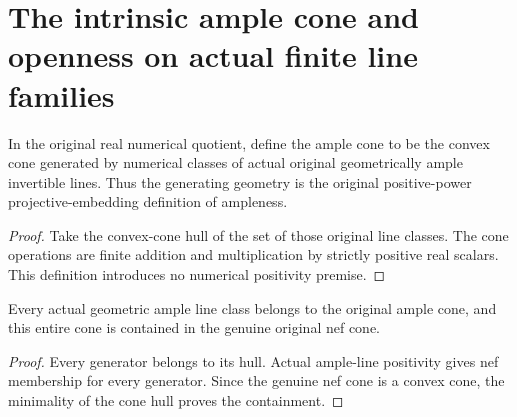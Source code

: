 \section{The intrinsic ample cone and openness on actual finite line families}
\label{sec:native-numerical-ample-cone}

\begin{definition}
\label{def:native-numerical-ample-cone}
\leanok
{}
In the original real numerical quotient, define the ample cone to be the
convex cone generated by numerical classes of actual original geometrically
ample invertible lines. Thus the generating geometry is the original
positive-power projective-embedding definition of ampleness.
\end{definition}
\begin{proof}
Take the convex-cone hull of the set of those original line classes. The
cone operations are finite addition and multiplication by strictly positive
real scalars. This definition introduces no numerical positivity premise.
\end{proof}

\begin{lemma}
\label{lem:native-numerical-ample-cone-nef}
\leanok
{}
Every actual geometric ample line class belongs to the original ample
cone, and this entire cone is contained in the genuine original nef cone.
\end{lemma}
\begin{proof}
Every generator belongs to its hull. Actual ample-line positivity gives
nef membership for every generator. Since the genuine nef cone is a
convex cone, the minimality of the cone hull proves the containment.
\end{proof}

